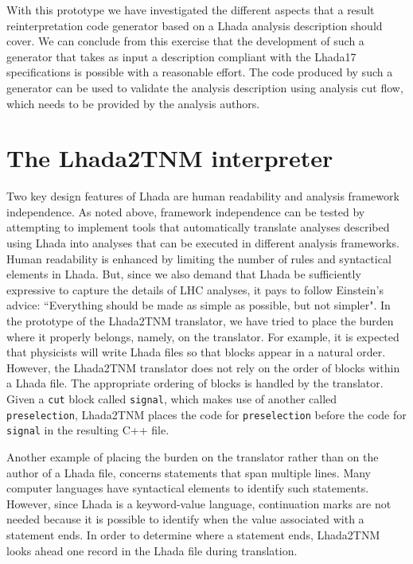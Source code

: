 \documentclass[11pt]{cernrep}
\begin{document}
With this prototype we have investigated the different aspects that a result reinterpretation code generator based on a {\sc Lhada} analysis description should cover. We can conclude from this exercise that the development of such a generator that takes as input a description compliant with the {\sc Lhada17} specifications is possible with a reasonable effort. The code produced by such a generator can be used to validate the analysis description using analysis cut flow, which needs to be provided by the analysis authors.  


\section{The {\sc Lhada2TNM} interpreter}
%

Two key design features of {\sc Lhada} are human readability and analysis framework independence. As noted above, framework independence can be tested by attempting to implement tools that automatically translate analyses described using {\sc Lhada} into analyses that can be executed in different analysis frameworks. Human readability is enhanced by limiting the number of rules and syntactical elements in {\sc Lhada}. But, since we also demand that {\sc Lhada} be sufficiently expressive to capture the details of LHC analyses, it pays to follow Einstein's advice: ``Everything should be made as simple as possible, but not simpler".    In the prototype of the  {\sc Lhada2TNM} translator, we have tried to place the burden where it properly belongs, namely, on the translator. For example, it is expected that physicists will write {\sc Lhada} files so that blocks appear in a natural order. However, the {\sc Lhada2TNM} translator does not rely on the order of blocks within a {\sc Lhada} file. The appropriate ordering of blocks is handled by the translator. Given a {\tt cut} block called {\tt signal}, which makes use of another called {\tt preselection}, {\sc Lhada2TNM} places  the code for {\tt preselection} before the code for {\tt signal} in the resulting C++ file.

Another example of placing the burden on the translator rather than on the author of a {\sc Lhada} file, concerns statements that span multiple lines. Many computer languages have syntactical elements to identify such statements. However, since {\sc Lhada} is a keyword-value language, continuation marks are not needed because it is possible to identify when the value associated with a statement ends. In order to determine where a statement ends, {\sc Lhada2TNM} looks ahead one record in the {\sc Lhada} file during translation.
\end{document}
